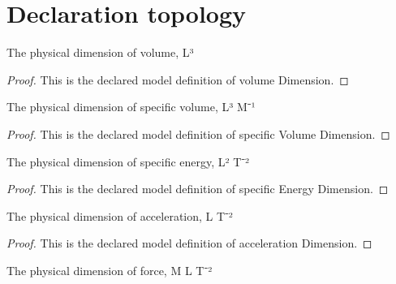\section{Declaration topology}
\begin{definition}
  \label{def:physics:phyx-mini-0463:phyxminiproblems-problemphyxmini0463-volumedimension}
  The physical dimension of volume, L³
\end{definition}
\begin{proof}
  This is the declared model definition of volume Dimension.
\end{proof}
\begin{definition}
  \label{def:physics:phyx-mini-0463:phyxminiproblems-problemphyxmini0463-specificvolumedimension}
  The physical dimension of specific volume, L³ M⁻¹
\end{definition}
\begin{proof}
  This is the declared model definition of specific Volume Dimension.
\end{proof}
\begin{definition}
  \label{def:physics:phyx-mini-0463:phyxminiproblems-problemphyxmini0463-specificenergydimension}
  The physical dimension of specific energy, L² T⁻²
\end{definition}
\begin{proof}
  This is the declared model definition of specific Energy Dimension.
\end{proof}
\begin{definition}
  \label{def:physics:phyx-mini-0463:phyxminiproblems-problemphyxmini0463-accelerationdimension}
  The physical dimension of acceleration, L T⁻²
\end{definition}
\begin{proof}
  This is the declared model definition of acceleration Dimension.
\end{proof}
\begin{definition}
  \label{def:physics:phyx-mini-0463:phyxminiproblems-problemphyxmini0463-forcedimension}
  The physical dimension of force, M L T⁻²
\end{definition}
